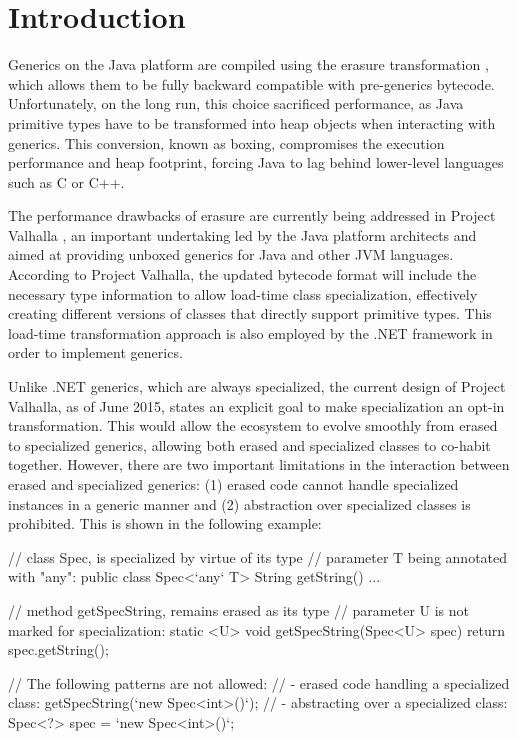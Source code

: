 \section{Introduction}
\label{sec:intro}

Generics on the Java platform are compiled using the erasure transformation \cite{java-erasure}, which allows them to be fully backward compatible with pre-generics bytecode. Unfortunately, on the long run, this choice sacrificed performance, as Java primitive types have to be transformed into heap objects when interacting with generics. This conversion, known as boxing, compromises the execution performance and heap footprint, forcing Java to lag behind lower-level languages such as C or C++.

The performance drawbacks of erasure are currently being addressed in Project Valhalla \cite{goetz-specialization, rose-value-classes-tearing, rose-value-classes-vm}, an important undertaking led by the Java platform architects and aimed at providing unboxed generics for Java and other JVM languages. According to Project Valhalla, the updated bytecode format will include the necessary type information to allow load-time class specialization, effectively creating different versions of classes that directly support primitive types. This load-time transformation approach is also employed by the .NET framework \cite{dot-net-generics, dot-net-generics-form} in order to implement generics.


Unlike .NET generics, which are always specialized, the current design of Project Valhalla, as of June 2015, states an explicit goal to make specialization an opt-in transformation. This would allow the ecosystem to evolve smoothly from erased to specialized generics, allowing both erased and specialized classes to co-habit together. However, there are two important limitations in the interaction between erased and specialized generics: (1) erased code cannot handle specialized instances in a generic manner and (2) abstraction over specialized classes is prohibited. This is shown in the following example:

\begin{lstlisting-nobreak}
// class Spec, is specialized by virtue of its type
// parameter T being annotated with "any":
public class Spec<`any` T> {
  String getString() { ... }
}

// method getSpecString, remains erased as its type
// parameter U is not marked for specialization:
static <U> void getSpecString(Spec<U> spec) {
  return spec.getString();
}

// The following patterns are not allowed:
//  - erased code handling a specialized class:
getSpecString(`new Spec<int>()`);
//  - abstracting over a specialized class:
Spec<?> spec = `new Spec<int>()`;
\end{lstlisting-nobreak}

